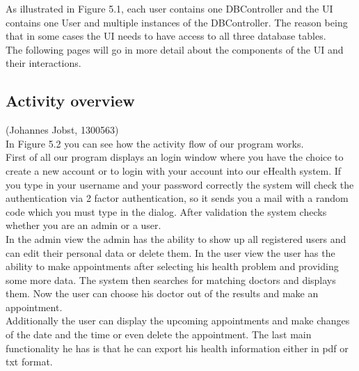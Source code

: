 \documentclass[a4paper, 12pt]{report}
\begin{document}
As illustrated in Figure 5.1, each user contains one DBController and the UI contains one User and multiple instances of the DBController. The reason being that in some cases the UI needs to have access to all three database tables.\\ The following pages will go in more detail about the components of the UI and their interactions.

\subsection{Activity overview}
{\tiny (Johannes Jobst, 1300563)\\}
In Figure 5.2 you can see how the activity flow of our program works.\\
First of all our program displays an login window where you have the choice to create a new account or to login with your account into our eHealth system. If you type in your username and your password correctly the system will check the authentication via 2 factor authentication, so it sends you a mail with a random code which you must type in the dialog. After validation the system checks whether you are an admin or a user.\\
In the admin view the admin has the ability to show up all registered users and can edit their personal data or delete them.
In the user view the user has the ability to make appointments after selecting his health problem and providing some more data. The system then searches for matching doctors and displays them. Now the user can choose his doctor out of the results and make an appointment.\\
Additionally the user can display the upcoming appointments and make changes of the date and the time or even delete the appointment.
The last main functionality he has is that he can export his health information either in pdf or txt format.
\end{document}
